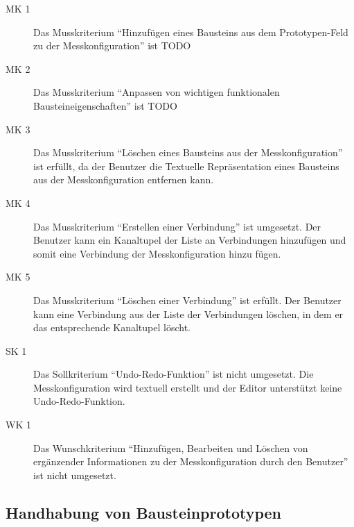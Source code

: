 \documentclass[parskip=full]{scrartcl}
\begin{document}
\begin{description}
\item[MK 1] Das Musskriterium "`Hinzufügen eines Bausteins aus dem Prototypen-Feld zu der Messkonfiguration"' ist TODO
\item[MK 2] Das Musskriterium "`Anpassen von wichtigen funktionalen Bausteineigenschaften"' ist TODO
\item[MK 3] Das Musskriterium "`Löschen eines Bausteins aus der Messkonfiguration"' ist erfüllt, da der Benutzer die Textuelle Repräsentation eines Bausteins aus der Messkonfiguration entfernen kann.
\item[MK 4] Das Musskriterium "`Erstellen einer Verbindung"' ist umgesetzt. Der Benutzer kann ein Kanaltupel der Liste an Verbindungen hinzufügen und somit eine Verbindung der Messkonfiguration hinzu fügen. 
\item[MK 5] Das Musskriterium "`Löschen einer Verbindung"' ist erfüllt. Der Benutzer kann eine Verbindung aus der Liste der Verbindungen löschen, in dem er das entsprechende Kanaltupel löscht.
\item[SK 1] Das Sollkriterium "`Undo-Redo-Funktion"' ist nicht umgesetzt. Die Messkonfiguration wird textuell erstellt und der Editor unterstützt keine Undo-Redo-Funktion. 
\item[WK 1] Das Wunschkriterium "`Hinzufügen, Bearbeiten und Löschen von ergänzender Informationen zu der Messkonfiguration durch den Benutzer"' ist nicht umgesetzt.
\end{description}
\subsection{Handhabung von Bausteinprototypen}
\end{document}
